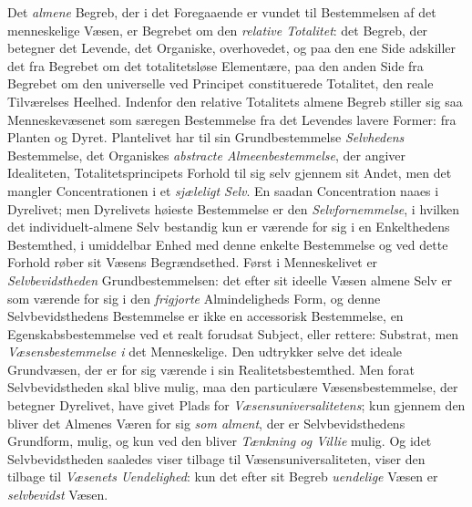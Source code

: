 Det \emph{almene} Begreb, der i det Foregaaende er vundet til Bestemmelsen af
det menneskelige Væsen, er Begrebet om den \emph{relative Totalitet}: det
Begreb, der betegner det Levende, det Organiske, overhovedet, og paa den ene
Side adskiller det fra Begrebet om det totalitetsløse Elementære, paa den anden
Side fra Begrebet om den universelle ved Principet constituerede Totalitet, den
reale Tilværelses Heelhed. Indenfor den relative Totalitets almene Begreb
stiller sig saa Menneskevæsenet som særegen Bestemmelse fra det Levendes lavere
Former: fra Planten og Dyret. Plantelivet har til sin Grundbestemmelse
\emph{Selvhedens} Bestemmelse, det Organiskes \emph{abstracte
Almeenbestemmelse}, der angiver Idealiteten, Totalitetsprincipets Forhold til
sig selv gjennem sit Andet, men det mangler Concentrationen i et
\emph{sjæleligt Selv}. En saadan Concentration naaes i Dyrelivet; men
Dyrelivets høieste Bestemmelse er den \emph{Selvfornemmelse}, i hvilken det
individuelt-almene Selv bestandig kun er værende for sig i en Enkelthedens
Bestemthed, i umiddelbar Enhed med denne enkelte Bestemmelse og ved dette
Forhold røber sit Væsens Begrændsethed. Først i Menneskelivet er
\emph{Selvbevidstheden} Grundbestemmelsen: det efter sit ideelle Væsen almene
Selv er som værende for sig i den \emph{frigjorte} Almindeligheds Form, og
denne Selvbevidsthedens Bestemmelse er ikke en accessorisk Bestemmelse, en
Egenskabsbestemmelse ved et realt forudsat Subject, eller rettere: Substrat,
men \emph{Væsensbestemmelse i} det Menneskelige. Den udtrykker selve det ideale
Grundvæsen, der
 er for sig værende i sin Realitetsbestemthed. Men forat Selvbevidstheden skal
blive mulig, maa den particulære Væsensbestemmelse, der betegner Dyrelivet,
have givet Plads for \emph{Væsensuniversalitetens}; kun gjennem den bliver det
Almenes Væren for sig \emph{som alment}, der er Selvbevidsthedens Grundform,
mulig, og kun ved den bliver \emph{Tænkning og Villie} mulig. Og idet
Selvbevidstheden saaledes viser tilbage til Væsensuniversaliteten, viser den
tilbage til \emph{Væsenets Uendelighed}: kun det efter sit Begreb
\emph{uendelige} Væsen er \emph{selvbevidst} Væsen.


